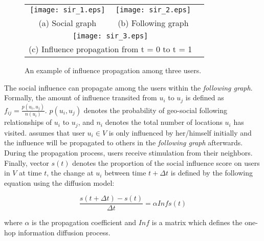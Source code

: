 \begin{figure}[h]
\begin{center}
\begin{tabular}{ccc}

\texttt{[image: sir\_1.eps]} &
\texttt{[image: sir\_2.eps]}
\\
(a) Social graph & (b) Following graph
\\
\multicolumn{2}{c}{\texttt{[image: sir\_3.eps]}}
\\
\multicolumn{2}{c}{(c) Influence propagation from t = 0 to t = 1}

\end{tabular}
\end{center}
\vspace{-3mm}
\caption{An example of influence propagation among three users.}
\label{fig:sir_example}
\end{figure}

The social influence can propagate among the users within the \textit{following graph}. Formally, the amount of influence transited from ${u_i}$ to ${u_j}$ is defined as ${f_{ij}=\frac{p(u_i,u_j)}{n(u_i)}}$. ${p(u_i, u_j)}$ denotes the probability of geo-social following relationships of ${u_i}$ to ${u_j}$, and ${n_i}$ denotes the total number of locations ${u_i}$ has visited. \cite{ytwen2014} assumes that user ${u_i \in V}$ is only influenced by her/himself initially and the influence will be propagated to others in the  \textit{following graph} afterwards. During the propagation process, users receive stimulation from their neighbors. Finally, vector ${s(t)}$ denotes the proportion of the social influence score on users in $V$ at time $t$, the change at ${u_i}$ between time ${t+\Delta t}$ is defined by the following equation using the diffusion model:

\begin{equation}\label{eq:diffusion}
\frac{s(t+\Delta t)-s(t)}{\Delta t}=\alpha Inf s(t)
\end{equation}

where ${\alpha}$ is the propagation coefficient and $Inf$ is a matrix which defines the one-hop information diffusion process. 
